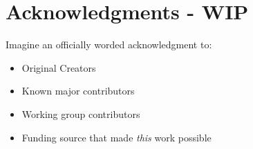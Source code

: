 \chapter*{Acknowledgments - WIP}

Imagine an officially worded acknowledgment to:
\begin{itemize}
 em
\item Original Creators
\item Known major contributors
\item Working group contributors
\item Funding source that made \emph{this} work possible
\end{itemize}
